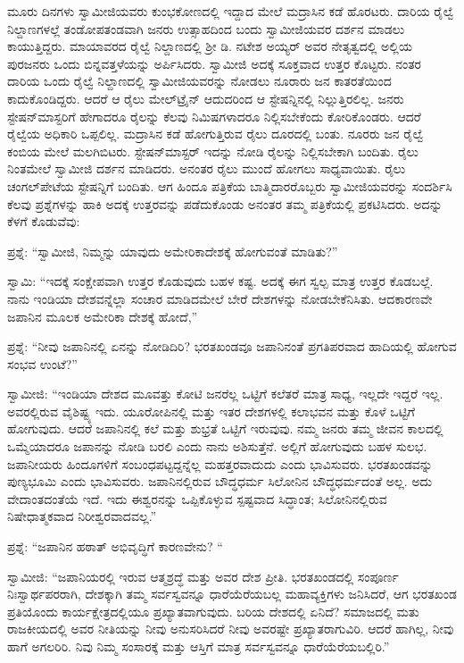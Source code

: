  ಮೂರು ದಿನಗಳು ಸ್ವಾಮೀಜಿಯವರು ಕುಂಭಕೋಣದಲ್ಲಿ ಇದ್ದಾದ ಮೇಲೆ ಮದ್ರಾಸಿನ ಕಡೆ ಹೊರಟರು. ದಾರಿಯ ರೈಲ್ವೆ ನಿಲ್ದಾಣಗಳಲ್ಲೆ ತಂಡೋಪತಂಡವಾಗಿ ಜನರು ಉತ್ಸಾಹದಿಂದ ಬಂದು ಸ್ವಾಮೀಜಿಯವರ ದರ್ಶನ ಮಾಡಲು ಕಾಯುತ್ತಿದ್ದರು. ಮಾಯಾವರದ ರೈಲ್ವೆ ನಿಲ್ದಾಣದಲ್ಲಿ ಶ‍್ರೀ ಡಿ. ನಟೇಶ ಅಯ್ಯರ್ ಅವರ ನೇತೃತ್ವದಲ್ಲಿ ಅಲ್ಲಿಯ ಪುರಜನರು ಒಂದು ಬಿನ್ನವತ್ತಳೆಯನ್ನು ಅರ್ಪಿಸಿದರು. ಸ್ವಾಮೀಜಿ ಅದಕ್ಕೆ ಸೂಕ್ತವಾದ ಉತ್ತರ ಕೊಟ್ಟರು. ನಂತರ ದಾರಿಯ ಒಂದು ರೈಲ್ವೆ ನಿಲ್ದಾಣದಲ್ಲಿ ಸ್ವಾಮೀಜಿಯವರನ್ನು ನೋಡಲು ನೂರಾರು ಜನ ಕಾತರತೆಯಿಂದ ಕಾದುಕೊಂಡಿದ್ದರು. ಆದರೆ ಆ ರೈಲು ಮೇಲ್‌ಟ್ರೈನ್ ಆದುದರಿಂದ ಆ ಸ್ಟೇಷನ್ನಿನಲ್ಲಿ ನಿಲ್ಲುತ್ತಿರಲಿಲ್ಲ. ಜನರು ಸ್ಟೇಷನ್‌ಮಾಸ್ಟರಿಗೆ ಹೇಗಾದರೂ ರೈಲನ್ನು ಕೆಲವು ನಿಮಿಷಗಳಾದರೂ ನಿಲ್ಲಿಸಬೇಕೆಂದು ಕೋರಿಕೊಂಡರು. ಆದರೆ ರೈಲ್ವೆಯ ಅಧಿಕಾರಿ ಒಪ್ಪಲಿಲ್ಲ. ಮದ್ರಾಸಿನ ಕಡೆ ಹೋಗುತ್ತಿರುವ ರೈಲು ದೂರದಲ್ಲಿ ಬಂತು. ನೂರರು ಜನ ರೈಲ್ವೆ ಕಂಬಿಯ ಮೇಲೆ ಮಲಗಿಬಿಟರು. ಸ್ಟೇಷನ್‌ಮಾಸ್ಟರ್ ಇದನ್ನು ನೋಡಿ ರೈಲನ್ನು ನಿಲ್ಲಿಸಬೇಕಾಗಿ ಬಂದಿತು. ರೈಲು ನಿಂತಮೇಲೆ ಸ್ವಾಮೀಜಿ ದರ್ಶನ ಮಾಡಿದರು. ಅನಂತರ ರೈಲು ಮುಂದೆ ಹೋಗಲು ಸಾಧ್ಯವಾಯಿತು. ರೈಲು ಚಂಗಲ್‌ಪೇಟೆಯ ಸ್ಟೇಷನ್ನಿಗೆ ಬಂದಿತು. ಆಗ ಹಿಂದೂ ಪತ್ರಿಕೆಯ ಬಾತ್ಮಿದಾರರೊಬ್ಬರು ಸ್ವಾಮೀಜಿಯವರನ್ನು ಸಂದರ್ಶಿಸಿ ಕೆಲವು ಪ್ರಶ್ನೆಗಳನ್ನು ಹಾಕಿ ಅದಕ್ಕೆ ಉತ್ತರವನ್ನು ಪಡೆದುಕೊಂಡು ಅನಂತರ ತಮ್ಮ ಪತ್ರಿಕೆಯಲ್ಲಿ ಪ್ರಕಟಿಸಿದರು. ಅದನ್ನು ಕೆಳಗೆ ಕೊಡುವೆವು: 

 ಪ್ರಶ್ನೆ: “ಸ್ವಾಮೀಜಿ, ನಿಮ್ಮನ್ನು ಯಾವುದು ಅಮೇರಿಕಾದೇಶಕ್ಕೆ ಹೋಗುವಂತೆ ಮಾಡಿತು?” 

 ಸ್ವಾಮಿ: “ಇದಕ್ಕೆ ಸಂಕ್ಷೇಪವಾಗಿ ಉತ್ತರ ಕೊಡುವುದು ಬಹಳ ಕಷ್ಟ. ಅದಕ್ಕೆ ಈಗ ಸ್ವಲ್ಪ ಮಾತ್ರ ಉತ್ತರ ಕೊಡಬಲ್ಲೆ. ನಾನು ಇಂಡಿಯಾ ದೇಶವನ್ನೆಲ್ಲಾ ಸಂಚಾರ ಮಾಡಿದಮೇಲೆ ಬೇರೆ ದೇಶಗಳನ್ನು ನೋಡಬೇಕೆನಿಸಿತು. ಆದಕಾರಣವೇ ಜಪಾನಿನ ಮೂಲಕ ಅಮೇರಿಕಾ ದೇಶಕ್ಕೆ ಹೋದೆ,” 

 ಪ್ರಶ್ನೆ: “ನೀವು ಜಪಾನಿನಲ್ಲಿ ಏನನ್ನು ನೋಡಿದಿರಿ? ಭರತಖಂಡವೂ ಜಪಾನಿನಂತೆ ಪ್ರಗತಿಪರವಾದ ಹಾದಿಯಲ್ಲಿ ಹೋಗುವ ಸಂಭವ ಉಂಟೆ?” 

 ಸ್ವಾಮೀಜಿ: “ಇಂಡಿಯಾ ದೇಶದ ಮೂವತ್ತು ಕೋಟಿ ಜನರೆಲ್ಲ ಒಟ್ಟಿಗೆ ಕಲೆತರೆ ಮಾತ್ರ ಸಾಧ್ಯ, ಇಲ್ಲದೇ ಇದ್ದರೆ ಇಲ್ಲ. ಅವರಲ್ಲಿರುವ ವೈಶಿಷ್ಟ್ಯ ಇದು. ಯೂರೋಪಿನಲ್ಲಿ ಮತ್ತು ಇತರ ದೇಶಗಳಲ್ಲಿ ಕಲಾಭವನ ಮತ್ತು ಕೊಳೆ ಒಟ್ಟಿಗೆ ಹೋಗುವುದು. ಆದರೆ ಜಪಾನಿನಲ್ಲಿ ಕಲೆ ಮತ್ತು ಶುಭ್ರತೆ ಒಟ್ಟಿಗೆ ಇರುವುವು. ನಮ್ಮ ಜನರು ತಮ್ಮ ಜೀವನ ಕಾಲದಲ್ಲಿ ಒಮ್ಮೆಯಾದರೂ ಜಪಾನನ್ನು ನೋಡಿ ಬರಲಿ ಎಂದು ನಾನು ಅಶಿಸುತ್ತೆನೆ. ಅಲ್ಲಿಗೆ ಹೋಗುವುದು ಬಹಳ ಸುಲಭ. ಜಪಾನೀಯರು ಹಿಂದೂಗಳಿಗೆ ಸಂಬಂಧಪಟ್ಟದ್ದನ್ನೆಲ್ಲ ಮಹತ್ತರವಾದುದು ಎಂದು ಭಾವಿಸುವರು. ಭರತಖಂಡವನ್ನು ಪುಣ್ಯಭೂಮಿ ಎಂದು ಭಾವಿಸುವರು. ಜಪಾನಿನಲ್ಲಿರುವ ಬೌದ್ಧಧರ್ಮ ಸಿಲೋನಿನ ಬೌದ್ಧಧರ್ಮದಂತೆ ಅಲ್ಲ. ಅದು ವೇದಾಂತದಂತೆಯೆ ಇದೆ. ಇದು ಈಶ್ವರನನ್ನು ಒಪ್ಪಿಕೊಳ್ಳುವ ಸ್ಪಷ್ಟವಾದ ಸಿದ್ಧಾಂತ; ಸಿಲೋನಿನಲ್ಲಿರುವ ನಿಷೇಧಾತ್ಮಕವಾದ ನಿರೀಶ್ವರವಾದವಲ್ಲ.” 

 ಪ್ರಶ್ನೆ: “ಜಪಾನಿನ ಹಠಾತ್ ಅಭಿವೃದ್ಧಿಗೆ ಕಾರಣವೇನು? “ 

 ಸ್ವಾಮೀಜಿ: “ಜಪಾನಿಯರಲ್ಲಿ ಇರುವ ಆತ್ಮಶ್ರದ್ಧೆ ಮತ್ತು ಅವರ ದೇಶ ಪ್ರೀತಿ. ಭರತಖಂಡದಲ್ಲಿ ಸಂಪೂರ್ಣ ನಿಃಸ್ವಾರ್ಥಪರರಾಗಿ, ದೇಶಕ್ಕಾಗಿ ತಮ್ಮ ಸರ್ವಸ್ವವನ್ನೂ ಧಾರೆಯೆರೆಯಬಲ್ಲ ಮಹಾವ್ಯಕ್ತಿಗಳು ಜನಿಸಿದರೆ, ಆಗ ಭರತಖಂಡ ಪ್ರತಿಯೊಂದು ಕಾರ್ಯಕ್ಷೇತ್ರದಲ್ಲಿಯೂ ಪ್ರಖ್ಯಾತವಾಗುವುದು. ಬರಿಯ ದೇಶದಲ್ಲಿ ಏನಿದೆ? ಸಮಾಜದಲ್ಲಿ ಮತು ರಾಜಕೀಯದಲ್ಲಿ ಅವರ ನೀತಿಯನ್ನು ನೀವು ಅನುಸರಿಸಿದರೆ ನೀವು ಅವರಷ್ಟೇ ಪ್ರಖ್ಯಾತರಾಗುವಿರಿ. ಆದರೆ ಹಾಗಿಲ್ಲ, ನೀವು ಹಾಗೆ ಅಗಲರಿರಿ. ನಿವು ನಿಮ್ಮ ಸಂಸಾರಕ್ಕೆ ಮತ್ತು ಆಸ್ತಿಗೆ ಮಾತ್ರ ಸರ್ವಸ್ವವನ್ನೂ ಧಾರೆಯೆರೆಯಬಲ್ಲಿರಿ.” 

